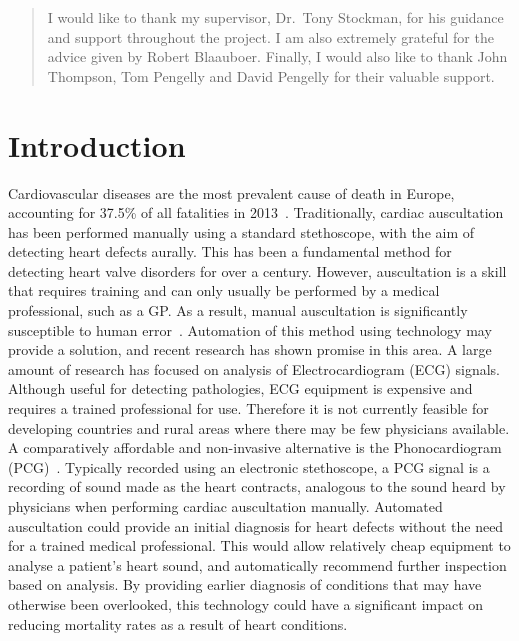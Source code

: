 \documentclass[titlepage, 12pt]{scrartcl} \usepackage{enumitem}
\begin{document}
\renewcommand{\abstractname}{Acknowledgements}
\begin{abstract}
I would like to thank my supervisor, Dr.\ Tony Stockman, for his guidance and
support throughout the project. I am also extremely grateful for the advice
given by Robert Blaauboer. Finally, I would also like to thank John Thompson,
Tom Pengelly and David Pengelly for their valuable support.
\end{abstract}

\tableofcontents
\newpage

\section{Introduction}
Cardiovascular diseases are the most prevalent cause of death in Europe,
accounting for 37.5\% of all fatalities in 2013~\parencite{Eurostat2016}.
Traditionally, cardiac auscultation has been performed manually using a standard
stethoscope, with the aim of detecting heart defects aurally. This has been a
fundamental method for detecting heart valve disorders for over a century.
However, auscultation is a skill that requires training and can only usually be
performed by a medical professional, such as a GP. As a result, manual
auscultation is significantly susceptible to human error~\parencite{Hanna2002}.
Automation of this method using technology may provide a solution, and
recent research has shown promise in this area. A large amount of research has
focused on analysis of Electrocardiogram (ECG) signals.  Although useful for
detecting pathologies, ECG equipment is expensive and requires a trained
professional for use. Therefore it is not currently feasible for developing
countries and rural areas where there may be few physicians available. A
comparatively affordable and non-invasive alternative is the Phonocardiogram
(PCG)~\parencite[p.130]{Reed2004}. Typically recorded using an electronic
stethoscope, a PCG signal is a recording of sound made as the heart contracts,
analogous to the sound heard by physicians when performing cardiac auscultation
manually. Automated auscultation could provide an initial diagnosis for heart
defects without the need for a trained medical professional. This would allow
relatively cheap equipment to analyse a patient's heart sound, and
automatically recommend further inspection based on analysis.  By providing
earlier diagnosis of conditions that may have otherwise been overlooked, this
technology could have a significant impact on reducing mortality rates as a
result of heart conditions.
\end{document}
